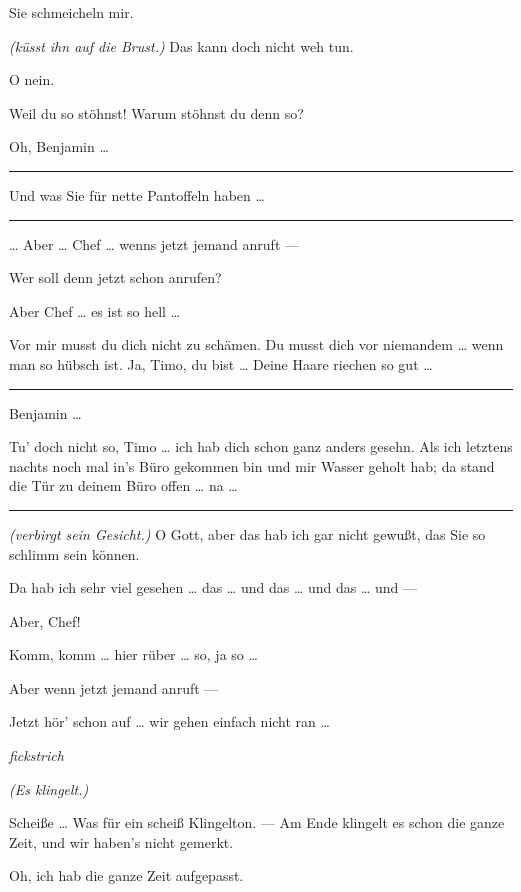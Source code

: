 \documentclass[
	final,
	a4paper,
	ngerman,
	mpinclude = true, %
	twoside = true,
	open = right,
	cleardoublepage = plain,
	DIV = 13,
	BCOR = 1cm,
	titlepage = firstiscover,
	]{scrbook}
\newcommand{\direction}[1]{\textit{(#1)}}
\newcommand{\hiat}{%
	\begin{center}
		\tiny
		\raisebox{0.5ex}{\rule{0.3\linewidth}{0.4pt}}
		\textit{fickstrich}
		\raisebox{0.5ex}{\rule{0.3\linewidth}{0.4pt}}
	\end{center}
}
\newenvironment{deletion}{%
		\vspace{0.25\baselineskip}
		\hrule
		\vspace{0.25\baselineskip}
		\color{darkgray}
	}{
		\color{black}
		\vspace{0.25\baselineskip}
		\hrule 
		\vspace{0.25\baselineskip}
	}
\newcommand{\thecharacter}[1]{\textup{\textsc{#1}}\xspace}
\newcommand{\thepraktikant}{\thecharacter{Timo}}
\newcommand{\theherr}{\thecharacter{Benjamin}}
\newcommand{\character}[1]{\item[#1:]}
\newcommand{\praktikant}{\character{\thepraktikant}}
\newcommand{\herr}{\character{\theherr}}
\begin{document}
\begin{play}
	\praktikant
	Sie schmeicheln mir.

	\herr
	\direction{küsst ihn auf die Brust.} Das kann doch nicht weh tun.

	\praktikant
	O nein.

	\herr
	Weil du so stöhnst! Warum stöhnst du denn so?

	\praktikant
	Oh, Benjamin \ldots{}

	\begin{deletion}
	\herr
	Und was Sie für nette Pantoffeln haben \ldots{}
	\end{deletion}

	\praktikant
	\ldots{} Aber \ldots{} Chef \ldots{} wenns jetzt jemand anruft ---

	\herr
	Wer soll denn jetzt schon anrufen?

	\praktikant
	Aber Chef \ldots{} es ist so hell \ldots{}

	\herr
	Vor mir musst du dich nicht zu schämen. Du musst dich vor niemandem \ldots{} wenn man so hübsch ist. Ja, Timo, du bist \ldots{} Deine Haare riechen so gut \ldots{}

	\begin{deletion}
	\praktikant
	Benjamin \ldots{}

	\herr
	Tu' doch nicht so, Timo \ldots{} ich hab dich schon ganz anders gesehn. Als ich letztens nachts noch mal in's Büro gekommen bin und mir Wasser geholt hab; da stand die Tür zu deinem Büro offen \ldots{} na \ldots{}
	\end{deletion}

	\praktikant
	\direction{verbirgt sein Gesicht.} O Gott, aber das hab ich gar nicht gewußt, das Sie so schlimm sein können.

	\herr
	Da hab ich sehr viel gesehen \ldots{} das \ldots{} und das \ldots{} und das \ldots{} und ---

	\praktikant
	Aber, Chef!

	\herr
	Komm, komm \ldots{} hier rüber \ldots{} so, ja so \ldots{}

	\praktikant
	Aber wenn jetzt jemand anruft ---

	\herr
	Jetzt hör' schon auf \ldots{} wir gehen einfach nicht ran \ldots{}

	\hiat

	\direction{Es klingelt.}

	\herr
	Scheiße \ldots{} Was für ein scheiß Klingelton. --- Am Ende klingelt es schon die ganze Zeit, und wir haben's nicht gemerkt.

	\praktikant
	Oh, ich hab die ganze Zeit aufgepasst.


\end{play}
\end{document}
